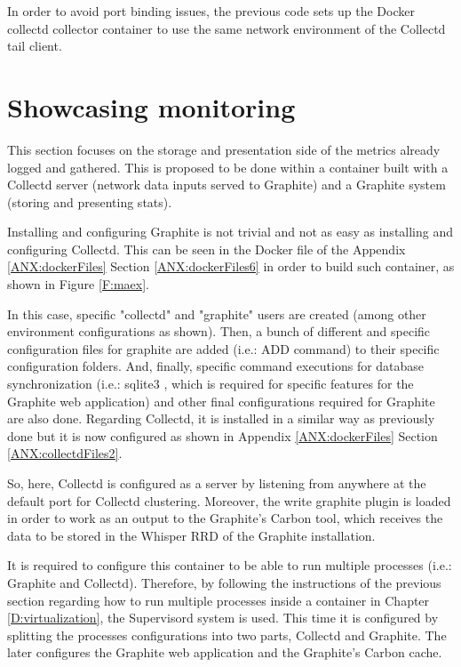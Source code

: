 In order to avoid port binding issues, the previous code sets up the Docker collectd collector container to use the same network environment of the Collectd tail client.

\section{Showcasing monitoring}

This section focuses on the storage and presentation side of the metrics already logged and gathered. This is proposed to be done within a container built with a Collectd server (network data inputs served to Graphite) and a Graphite system (storing and presenting stats).

Installing and configuring Graphite is not trivial and not as easy as installing and configuring Collectd. This can be seen in the Docker file of the Appendix \ref{ANX:dockerFiles} Section \ref{ANX:dockerFiles6} in order to build such container, as shown in Figure \ref{F:maex}.

In this case, specific "collectd" and "graphite" users are created (among other environment configurations as shown). Then, a bunch of different and specific configuration files for graphite are added (i.e.: ADD command) to their specific configuration folders. And, finally, specific command executions for database synchronization (i.e.: sqlite3 \cite{sqlite}, which is required for specific features for the Graphite web application) and other final configurations required for Graphite are also done. Regarding Collectd, it is installed in a similar way as previously done but it is now configured as shown in Appendix \ref{ANX:dockerFiles} Section \ref{ANX:collectdFiles2}.

So, here, Collectd is configured as a server by listening from anywhere at the default port for Collectd clustering. Moreover, the write graphite plugin is loaded in order to work as an output to the Graphite's Carbon tool, which receives the data to be stored in the Whisper RRD of the Graphite installation.

It is required to configure this container to be able to run multiple processes (i.e.: Graphite and Collectd). Therefore, by following the instructions of the previous section regarding how to run multiple processes inside a container in Chapter \ref{D:virtualization}, the Supervisord system is used. This time it is configured by splitting the processes configurations into two parts, Collectd and Graphite. The later configures the Graphite web application and the Graphite's Carbon cache.

